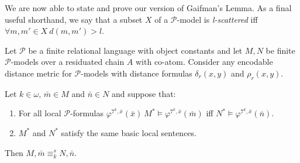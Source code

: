 \documentclass{lmcs} %
\newcommand{\?}{\ensuremath{\mkern0.4\thinmuskip}}
\let\phi=\varphi
\newcommand{\CP}{\mathcal{P}}
\begin{document}
We are now able to state and prove our version of Gaifman's Lemma. As a final useful shorthand, we say that a subset $X$ of a $\CP$-model is \emph{l-scattered} iff $\forall m,m'\in X\ d(m,m')>l$. 
\begin{thm}\label{thm:GaifLem}
    Let $\CP$ be a finite relational language with object constants and let $M,N$ be finite $\CP$-models over a residuated chain $A$ with co-atom. Consider any encodable distance metric for $\CP$-models with distance formulas $\delta_r(x,y)$ and $\rho_r(x,y)$.

    \noindent
    Let $k\in\omega$, $\bar{m}\in M$ and $\bar{n}\in N$ and suppose that:\begin{enumerate}[label=\roman*.]
        \item For all local $\CP$-formulas $\phi^{7^k,\bar{x}}(\bar{x})\ M^\ast\models\phi^{7^k,\bar{x}}(\bar{m})$ iff $N^\ast\models\phi^{7^k,\bar{x}}(\bar{n})$.
        \item $M^\ast$ and $N^\ast$ satisfy the same basic local sentences.
    \end{enumerate}
    Then $M,\bar{m}\equiv^s_k N,\bar{n}$.
\end{thm}
\end{document}
